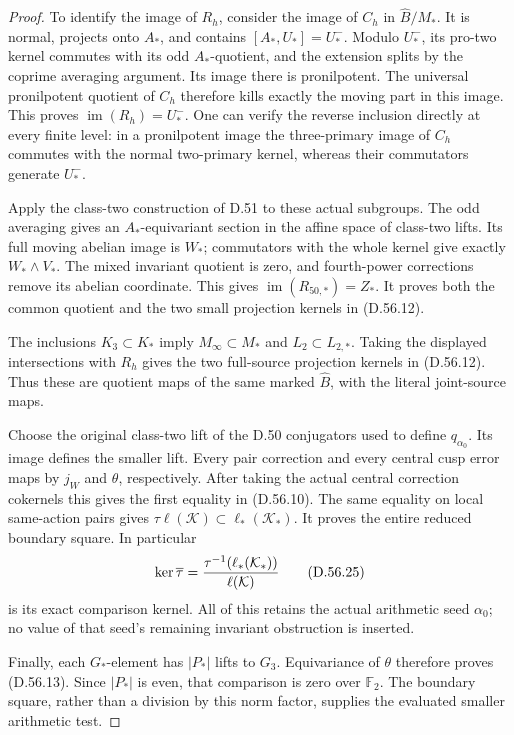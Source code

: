 \begin{proof}
To identify the image of \(R_h\), consider the image
of \(C_h\) in \(\widehat B/M_*\).
It is normal, projects onto \(A_*\), and contains
\([A_*,U_*]=U_*^-\).
Modulo \(U_*^-\), its pro-two kernel commutes with
its odd \(A_*\)-quotient, and the extension splits
by the coprime averaging argument. Its image there
is pronilpotent.
The universal pronilpotent quotient of \(C_h\)
therefore kills exactly the moving part in this
image. This proves
\(\operatorname{im}(R_h)=U_*^-\).
One can verify the reverse inclusion directly at
every finite level: in a pronilpotent image the
three-primary image of \(C_h\) commutes with the
normal two-primary kernel, whereas their
commutators generate \(U_*^-\).

Apply the class-two construction of D.51 to these
actual subgroups. The odd averaging gives an
\(A_*\)-equivariant section in the affine space
of class-two lifts. Its full moving abelian image
is \(W_*\); commutators with the whole kernel give
exactly \(W_*\wedge V_*\).
The mixed invariant quotient is zero, and
fourth-power corrections remove its abelian
coordinate. This gives
\(\operatorname{im}(R_{50,*})=Z_*\).
It proves both the common quotient and the two
small projection kernels in (D.56.12).

The inclusions \(K_3\subset K_*\) imply
\(M_\infty\subset M_*\) and \(L_2\subset L_{2,*}\).
Taking the displayed intersections with \(R_h\)
gives the two full-source projection kernels
in (D.56.12). Thus these are quotient maps of
the same marked \(\widehat B\), with the literal
joint-source maps.

Choose the original class-two lift of the D.50
conjugators used to define \(q_{\alpha_0}\).
Its image defines the smaller lift.
Every pair correction and every central cusp
error maps by \(j_W\) and \(\theta\), respectively.
After taking the actual central correction
cokernels this gives the first equality in
(D.56.10). The same equality on local same-action
pairs gives
\(\tau\ell(\mathcal K)\subset\ell_*(\mathcal K_*)\).
It proves the entire reduced boundary square.
In particular
\[
 \ker\overline\tau
     ={\tau^{-1}(\ell_*(\mathcal K_*))
                              \over\ell(\mathcal K)}
 \tag{D.56.25}
\]
is its exact comparison kernel.
All of this retains the actual arithmetic seed
\(\alpha_0\); no value of that seed's remaining
invariant obstruction is inserted.

Finally, each \(G_*\)-element has \(|P_*|\) lifts
to \(G_3\). Equivariance of \(\theta\) therefore
proves (D.56.13). Since \(|P_*|\) is even,
that comparison is zero over \(\mathbb F_2\).
The boundary square, rather than a division by
this norm factor, supplies the evaluated
smaller arithmetic test.
\end{proof}
